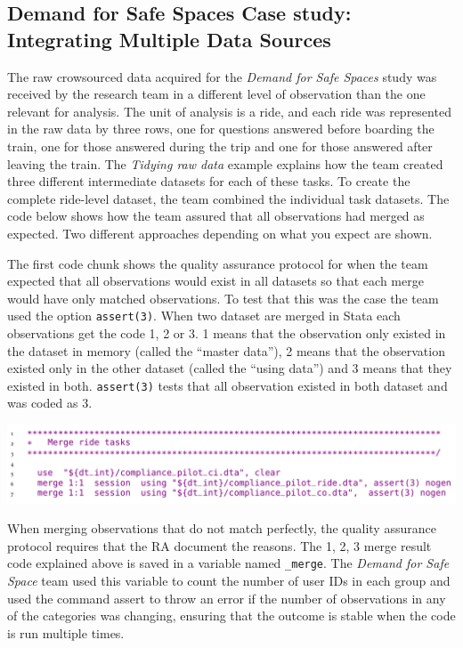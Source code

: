 \documentclass[
]{book}
\begin{document}
\begin{ex}
\hypertarget{demand-for-safe-spaces-case-study-integrating-multiple-data-sources}{%
\subsection{Demand for Safe Spaces Case study: Integrating Multiple Data Sources}\label{demand-for-safe-spaces-case-study-integrating-multiple-data-sources}}

The raw crowsourced data acquired for the \emph{Demand for Safe Spaces} study was received by the research team in a different level of observation than the one relevant for analysis. The unit of analysis is a ride, and each ride was represented in the raw data by three rows, one for questions answered before boarding the train, one for those answered during the trip and one for those answered after leaving the train. The \emph{Tidying raw data} example explains how the team created three different intermediate datasets for each of these tasks. To create the complete ride-level dataset, the team combined the individual task datasets. The code below shows how the team assured that all observations had merged as expected. Two different approaches depending on what you expect are shown.

The first code chunk shows the quality assurance protocol for when the team expected that all observations would exist in all datasets so that each merge would have only matched observations. To test that this was the case the team used the option \texttt{assert(3)}. When two dataset are merged in Stata each observations get the code 1, 2 or 3. 1 means that the observation only existed in the dataset in memory (called the ``master data''), 2 means that the observation existed only in the other dataset (called the ``using data'') and 3 means that they existed in both. \texttt{assert(3)} tests that all observation existed in both dataset and was coded as 3.

\includegraphics{examples/ch6-integrating-multiple-data-sources.png}

When merging observations that do not match perfectly, the quality assurance protocol requires that the RA document the reasons. The 1, 2, 3 merge result code explained above is saved in a variable named \texttt{\_merge}. The \emph{Demand for Safe Space} team used this variable to count the number of user IDs in each group and used the command assert to throw an error if the number of observations in any of the categories was changing, ensuring that the outcome is stable when the code is run multiple times.


\end{ex}
\end{document}

